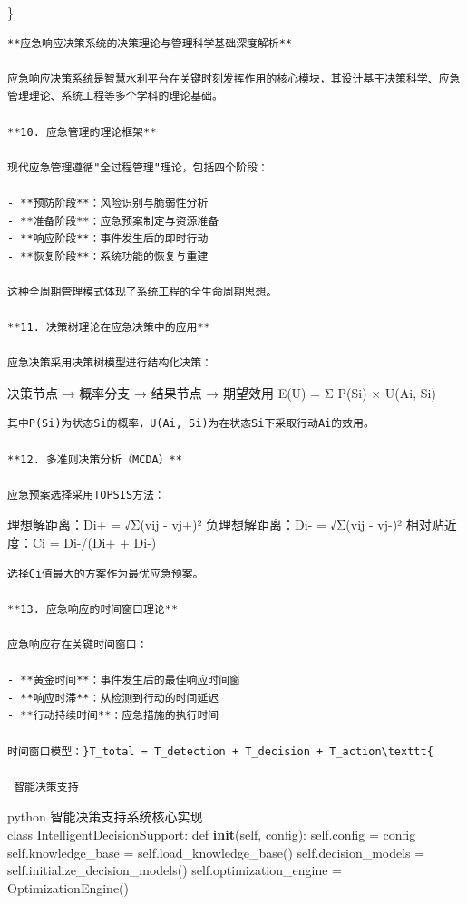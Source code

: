 \}

\begin{lstlisting}
**应急响应决策系统的决策理论与管理科学基础深度解析**

应急响应决策系统是智慧水利平台在关键时刻发挥作用的核心模块，其设计基于决策科学、应急管理理论、系统工程等多个学科的理论基础。

**10. 应急管理的理论框架**

现代应急管理遵循"全过程管理"理论，包括四个阶段：

- **预防阶段**：风险识别与脆弱性分析
- **准备阶段**：应急预案制定与资源准备  
- **响应阶段**：事件发生后的即时行动
- **恢复阶段**：系统功能的恢复与重建

这种全周期管理模式体现了系统工程的全生命周期思想。

**11. 决策树理论在应急决策中的应用**

应急决策采用决策树模型进行结构化决策：
\end{lstlisting}

决策节点 → 概率分支 → 结果节点 → 期望效用 E(U) = Σ P(Si) × U(Ai, Si)

\begin{lstlisting}
其中P(Si)为状态Si的概率，U(Ai, Si)为在状态Si下采取行动Ai的效用。

**12. 多准则决策分析（MCDA）**

应急预案选择采用TOPSIS方法：
\end{lstlisting}

理想解距离：Di+ = √Σ(vij - vj+)² 负理想解距离：Di- = √Σ(vij - vj-)² 相对贴近度：Ci = Di-/(Di+ + Di-)

\begin{lstlisting}
选择Ci值最大的方案作为最优应急预案。

**13. 应急响应的时间窗口理论**

应急响应存在关键时间窗口：

- **黄金时间**：事件发生后的最佳响应时间窗
- **响应时滞**：从检测到行动的时间延迟
- **行动持续时间**：应急措施的执行时间

时间窗口模型：}T_total = T_detection + T_decision + T_action\texttt{

 智能决策支持
\end{lstlisting}

python  智能决策支持系统核心实现\\
class IntelligentDecisionSupport: def \textbf{init}(self, config): self.config = config self.knowledge\_base = self.load\_knowledge\_base() self.decision\_models = self.initialize\_decision\_models() self.optimization\_engine = OptimizationEngine()

